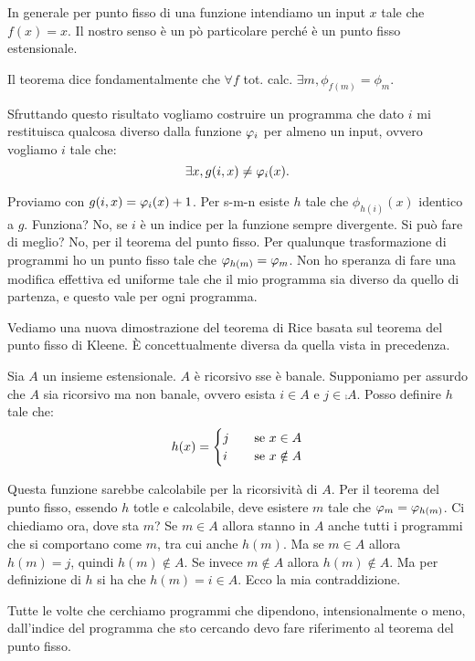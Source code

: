 In generale per punto fisso di una funzione intendiamo un input $x$ tale che $f(x) = x$. Il nostro senso
è un pò particolare perché è un punto fisso estensionale.

Il teorema dice fondamentalmente che $\forall f$ tot. calc. $\exists m, \phi_{f(m)} = \phi_{m}$.

Sfruttando questo risultato vogliamo costruire un programma che dato $i$ mi restituisca qualcosa
diverso dalla funzione $\varphi_{i}$ per almeno un input, ovvero vogliamo $i$ tale che:
\begin{equation*}
    \exists x, g(i,x) \not= \varphi_{i}(x).
\end{equation*}

Proviamo con $g(i,x) = \varphi_{i}(x) + 1$. Per s-m-n esiste $h$ tale che $\phi_{h(i)}(x)$ identico a $g$. 
Funziona? No, se $i$ è un indice per la funzione sempre divergente. Si può fare di meglio? No, per
il teorema del punto fisso. Per qualunque trasformazione di programmi ho un punto fisso tale che
$\varphi_{h(m)} = \varphi_{m}$. Non ho speranza di fare una modifica effettiva ed uniforme tale che il mio
programma sia diverso da quello di partenza, e questo vale per ogni programma.

Vediamo una nuova dimostrazione del teorema di Rice basata sul teorema del punto fisso di Kleene. È
concettualmente diversa da quella vista in precedenza.

Sia $A$ un insieme estensionale. $A$ è ricorsivo sse è banale. Supponiamo per assurdo che $A$ sia
ricorsivo ma non banale, ovvero esista $i \in A$ e $j \in \comp{A}$. Posso definire $h$ tale che:
\begin{equation*}
    h(x) = 
    \begin{cases}
        j \quad &\text{se $x \in A$}\\
        i \quad &\text{se $x \notin A$}
    \end{cases}
\end{equation*}

Questa funzione sarebbe calcolabile per la ricorsività di $A$. Per il teorema del punto fisso,
essendo $h$ totle e calcolabile, deve esistere $m$ tale che $\varphi_{m} = \varphi_{h(m)}$. Ci chiediamo ora,
dove sta $m$? Se $m \in A$ allora stanno in $A$ anche tutti i programmi che si comportano come $m$,
tra cui anche $h(m)$. Ma se $m \in A$ allora $h(m) = j$, quindi $h(m) \notin A$. Se invece $m \notin
A$ allora $h(m) \notin A$. Ma per definizione di $h$ si ha che $h(m) = i \in A$. Ecco la mia
contraddizione.

Tutte le volte che cerchiamo programmi che dipendono, intensionalmente o meno, dall'indice del
programma che sto cercando devo fare riferimento al teorema del punto fisso.

